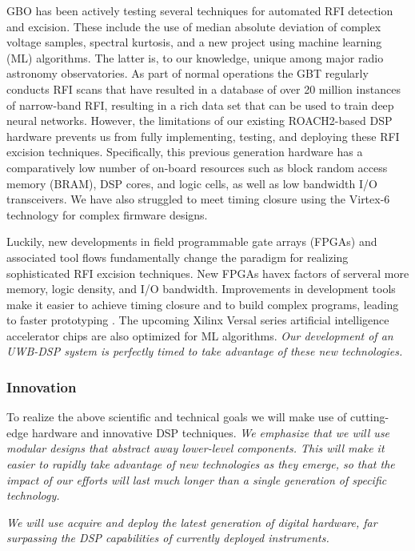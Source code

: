 \documentclass[10pt]{myNSF}
\begin{document}
 GBO has been actively testing several
techniques for automated RFI detection and excision.  These include
the use of median absolute deviation of complex voltage samples,
spectral kurtosis, and a new project using machine learning (ML)
algorithms.  The latter is, to our knowledge, unique among major radio
astronomy observatories.  As part of normal operations the GBT
regularly conducts RFI scans that have resulted in a database of over
20 million instances of narrow-band RFI, resulting in a rich data set
that can be used to train deep neural networks.  However, the
limitations of our existing ROACH2-based DSP hardware prevents us from
fully implementing, testing, and deploying these RFI excision
techniques.  Specifically, this previous generation hardware has a
comparatively low number of on-board resources such as block random
access memory (BRAM), DSP cores, and logic cells, as well as low bandwidth
I/O transceivers.  We have also struggled to meet timing closure using
the Virtex-6 technology for complex firmware designs.

Luckily, new developments in field programmable gate arrays (FPGAs)
and associated tool flows fundamentally change the paradigm for
realizing sophisticated RFI excision techniques.  New FPGAs havex
factors of serveral more memory, logic density, and I/O bandwidth.
Improvements in development tools make it easier to achieve timing
closure and to build complex programs, leading to faster prototyping .
The upcoming Xilinx Versal series artificial intelligence accelerator
chips are also optimized for ML algorithms.  \emph{Our development of
  an UWB-DSP system is perfectly timed to take advantage of these new
  technologies.}

\subsubsection{Innovation}
\label{sec:innovation}

To realize the above scientific and technical goals we will make use
of cutting-edge hardware and innovative DSP techniques.  \emph{We
  emphasize that we will use modular designs that abstract away
  lower-level components.  This will make it easier to rapidly take
  advantage of new technologies as they emerge, so that the impact of
  our efforts will last much longer than a single generation of
  specific technology.}


\emph{We will use acquire and deploy the latest generation of digital
  hardware, far surpassing the DSP capabilities of currently deployed
  instruments.}
\end{document}
